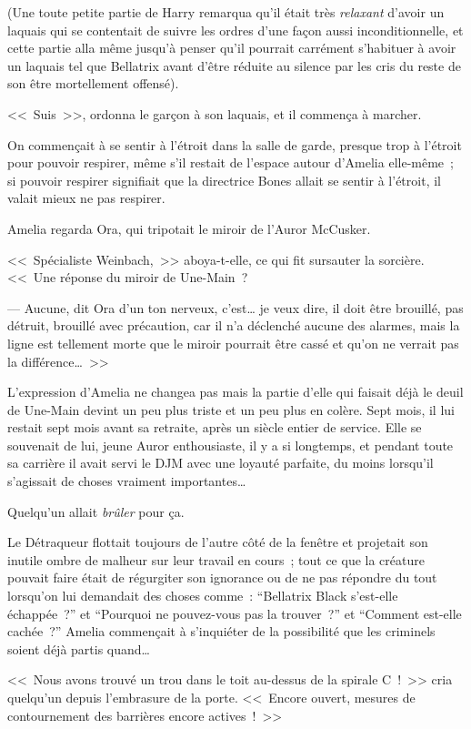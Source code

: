 (Une toute petite partie de Harry remarqua qu'il était très \emph{relaxant} d'avoir un laquais qui se contentait de suivre les ordres d'une façon aussi inconditionnelle, et cette partie alla même jusqu'à penser qu'il pourrait carrément s'habituer à avoir un laquais tel que Bellatrix avant d'être réduite au silence par les cris du reste de son être mortellement offensé).

<<~Suis~>>, ordonna le garçon à son laquais, et il commença à marcher.

\later

On commençait à se sentir à l'étroit dans la salle de garde, presque trop à l'étroit pour pouvoir respirer, même s'il restait de l'espace autour d'Amelia elle-même~; si pouvoir respirer signifiait que la directrice Bones allait se sentir à l'étroit, il valait mieux ne pas respirer.

Amelia regarda Ora, qui tripotait le miroir de l'Auror McCusker.

<<~Spécialiste Weinbach,~>> aboya-t-elle, ce qui fit sursauter la sorcière. <<~Une réponse du miroir de Une-Main~?

--- Aucune, dit Ora d'un ton nerveux, c'est… je veux dire, il doit être brouillé, pas détruit, brouillé avec précaution, car il n'a déclenché aucune des alarmes, mais la ligne est tellement morte que le miroir pourrait être cassé et qu'on ne verrait pas la différence…~>>

L'expression d'Amelia ne changea pas mais la partie d'elle qui faisait déjà le deuil de Une-Main devint un peu plus triste et un peu plus en colère. Sept mois, il lui restait sept mois avant sa retraite, après un siècle entier de service. Elle se souvenait de lui, jeune Auror enthousiaste, il y a si longtemps, et pendant toute sa carrière il avait servi le DJM avec une loyauté parfaite, du moins lorsqu'il s'agissait de choses vraiment importantes…

Quelqu'un allait \emph{brûler} pour ça.

Le Détraqueur flottait toujours de l'autre côté de la fenêtre et projetait son inutile ombre de malheur sur leur travail en cours~; tout ce que la créature pouvait faire était de régurgiter son ignorance ou de ne pas répondre du tout lorsqu'on lui demandait des choses comme~: “Bellatrix Black s'est-elle échappée~?” et “Pourquoi ne pouvez-vous pas la trouver~?” et “Comment est-elle cachée~?” Amelia commençait à s'inquiéter de la possibilité que les criminels soient déjà partis quand…

<<~Nous avons trouvé un trou dans le toit au-dessus de la spirale C~!~>> cria quelqu'un depuis l'embrasure de la porte. <<~Encore ouvert, mesures de contournement des barrières encore actives~!~>>

